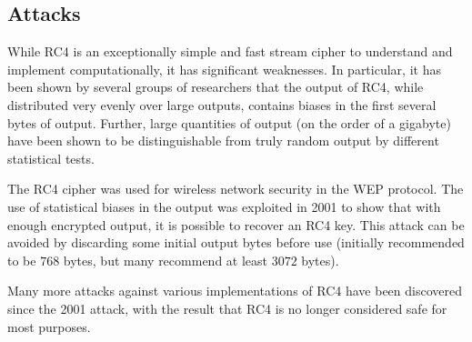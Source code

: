 \documentclass{book}
\theoremstyle{plain}
\theoremstyle{definition}
\begin{document}
\subsection{Attacks}
While RC4 is an exceptionally simple and fast stream cipher to understand and implement computationally, it has significant weaknesses. In particular, it has been shown by several groups of researchers that the output of RC4, while distributed very evenly over large outputs, contains biases in the first several bytes of output. Further, large quantities of output (on the order of a gigabyte) have been shown to be distinguishable from truly random output by different statistical tests.

The RC4 cipher was used for wireless network security in the WEP protocol. The use of statistical biases in the output was exploited in 2001 to show that with enough encrypted output, it is possible to recover an RC4 key. This attack can be avoided by discarding some initial output bytes before use (initially recommended to be $768$ bytes, but many recommend at least $3072$ bytes).

Many more attacks against various implementations of RC4 have been discovered since the 2001 attack, with the result that RC4 is no longer considered safe for most purposes.
\end{document}
